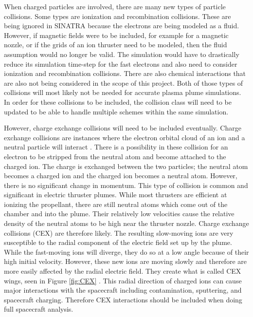 \indent When charged particles are involved, there are many new types of particle collisions. Some types are ionization and recombination collisions. These are being ignored in SINATRA because the electrons are being modeled as a fluid. However, if magnetic fields were to be included, for example for a magnetic nozzle, or if the grids of an ion thruster need to be modeled, then the fluid assumption would no longer be valid. The simulation would have to drastically reduce its simulation time-step for the fast electrons and also need to consider ionization and recombination collisions. There are also chemical interactions that are also not being considered in the scope of this project. Both of those types of collisions will most likely not be needed for accurate plasma plume simulations. In order for these collisions to be included, the collision class will need to be updated to be able to handle multiple schemes within the same simulation. \par

\indent However, charge exchange collisions will need to be included eventually. Charge exchange collisions are instances where the electron orbital cloud of an ion and a neutral particle will interact \cite{pic_generic}. There is a possibility in these collision for an electron to be stripped from the neutral atom and become attached to the charged ion. The charge is exchanged between the two particles; the neutral atom becomes a charged ion and the charged ion becomes a neutral atom. However, there is no significant change in momentum. This type of collision is common and significant in electric thruster plumes. While most thrusters are efficient at ionizing the propellant, there are still neutral atoms which come out of the chamber and into the plume. Their relatively low velocities cause the relative density of the neutral atoms to be high near the thruster nozzle. Charge exchange collisions (CEX) are therefore likely. The resulting slow-moving ions are very susceptible to the radial component of the electric field set up by the plume. While the fast-moving ions will diverge, they do so at a low angle because of their high initial velocity. However, these new ions are moving slowly and therefore are more easily affected by the radial electric field. They create what is called CEX wings, seen in Figure \ref{fig:CEX} \cite{cex_wings}. This radial direction of charged ions can cause major interactions with the spacecraft including contamination, sputtering, and spacecraft charging. Therefore CEX interactions should be included when doing full spacecraft analysis. 


